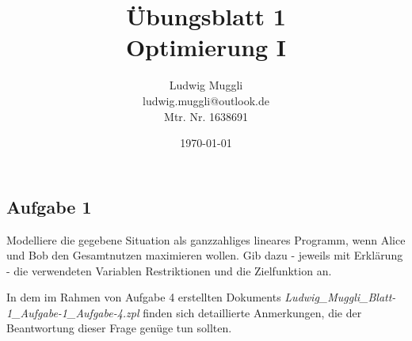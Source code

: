 \documentclass{article}
\date{\numdate\today}
\title {Übungsblatt 1 \\ \large{Optimierung I}}
\author{Ludwig Muggli \\ ludwig.muggli@outlook.de \\ Mtr. Nr. 1638691
        }
\begin{document}
\vspace*{-3cm}
{\let\newpage\relax\maketitle}

\subsection*{Aufgabe 1} Modelliere die gegebene Situation als ganzzahliges lineares Programm, wenn Alice und Bob den Gesamtnutzen maximieren wollen. Gib dazu - jeweils mit Erklärung - die verwendeten Variablen Restriktionen und die Zielfunktion an. \par \smallskip

In dem im Rahmen von Aufgabe 4 erstellten Dokuments \textit{Ludwig\_Muggli\_Blatt-1\_Aufgabe-1\_Aufgabe-4.zpl} finden sich detaillierte Anmerkungen, die der Beantwortung dieser Frage genüge tun sollten.
\end{document}
